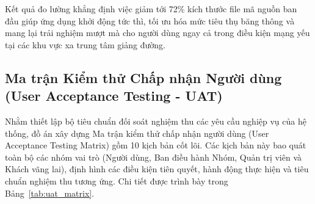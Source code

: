 Kết quả đo lường khẳng định việc giảm tới 72\% kích thước file mã nguồn ban đầu giúp ứng dụng khởi động tức thì, tối ưu hóa mức tiêu thụ băng thông và mang lại trải nghiệm mượt mà cho người dùng ngay cả trong điều kiện mạng yếu tại các khu vực xa trung tâm giảng đường.

\subsection{Ma trận Kiểm thử Chấp nhận Người dùng (User Acceptance Testing - UAT)}
Nhằm thiết lập bộ tiêu chuẩn đối soát nghiệm thu các yêu cầu nghiệp vụ của hệ thống, đồ án xây dựng Ma trận kiểm thử chấp nhận người dùng (User Acceptance Testing Matrix) gồm 10 kịch bản cốt lõi. Các kịch bản này bao quát toàn bộ các nhóm vai trò (Người dùng, Ban điều hành Nhóm, Quản trị viên và Khách vãng lai), định hình các điều kiện tiên quyết, hành động thực hiện và tiêu chuẩn nghiệm thu tương ứng. Chi tiết được trình bày trong Bảng~\ref{tab:uat_matrix}.

